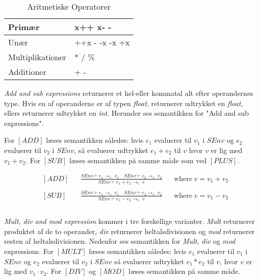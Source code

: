 \begin{table}[H]
    \centering
    \begin{tabular}{|l|l|}
        \hline
        \centering

        Primær             & x++ \quad x- -                                    \\ \hline
        Unær               & ++x \quad - -x \quad -x \quad +x                   \\ \hline
        Multiplikationer   & * \quad / \quad \%                                \\ \hline
        Additioner         & + \quad -                                         \\ \hline

    \end{tabular}
    \caption{Aritmetiske Operatorer}
    \label{tab:aritmetiskeOperatorer}
\end{table}

\textit{Add and sub expressions} returnerer et hel-eller kommatal alt efter operandernes type. Hvis en af operanderne er af typen \textit{float}, returnerer udtrykket en \textit{float}, ellers returnerer udtrykket en \textit{int}. Herunder ses semantikken for "Add and sub expressions"\mbox{}.

\noindent For $[ADD]$ læses semantikken således: hvis $e_1$ evaluerer til $v_1$ i $SEnv$ og $e_2$ evaluerer til $v_2$ i $SEnv$, så evaluerer udtrykket $e_1 + e_2$ til $v$ hvor $v$ er lig med $v_1 + v_2$.
\noindent For $[SUB]$ læses semantikken på samme måde som ved $[PLUS]$.

\begin{align*}
&[ADD] & &\frac{SEnv \vdash e_1 \rightarrow_e\; v_1\quad SEnv \vdash e_2 \rightarrow_e\; v_2}{SEnv \vdash e_1 + e_2 \rightarrow_e\; v} & &\text{where}\; v = v_1 + v_2\\\\
&[SUB] & &\frac{SEnv \vdash e_1 \rightarrow_e\; v_1\quad SEnv \vdash e_2 \rightarrow_e\; v_2}{SEnv \vdash e_1 - e_2 \rightarrow_e\; v} & &\text{where}\; v = v_1 - v_2\\\\
\end{align*}

\textit{Mult, div and mod expression} kommer i tre forskellige varianter. \textit{Mult} returnerer produktet af de to operander, \textit{div} returnerer heltalsdivisionen og \textit{mod} returnerer resten af heltalsdivisionen. Nedenfor ses semantikken for \textit{Mult}, \textit{div} og \textit{mod} expressions.
For $[MULT]$ læses semantikken således: hvis $e_1$ evaluerer til $v_1$ i $SEnv$ og $e_2$ evaluerer til $v_2$ i $SEnv$ så evaluerer udtrykket $e_1 * e_2$ til $v$, hvor $v$ er lig med $v_1 \cdot v_2$.
For $[DIV]$ og $[MOD]$ læses semantikken på samme måde.

